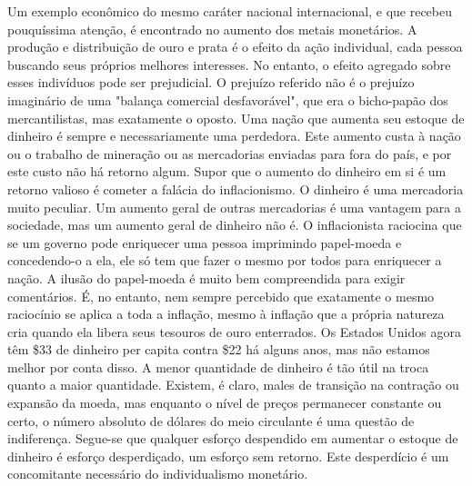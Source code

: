 \documentclass[12pt]{article}
\begin{document}
Um exemplo econômico do mesmo caráter nacional internacional, e que recebeu pouquíssima atenção, é encontrado no aumento dos metais monetários. A produção e distribuição de ouro e prata é o efeito da ação individual, cada pessoa buscando seus próprios melhores interesses. No entanto, o efeito agregado sobre esses indivíduos pode ser prejudicial. O prejuízo referido não é o prejuízo imaginário de uma "balança comercial desfavorável", que era o bicho-papão dos mercantilistas, mas exatamente o oposto. Uma nação que aumenta seu estoque de dinheiro é sempre e necessariamente uma perdedora. Este aumento custa à nação ou o trabalho de mineração ou as mercadorias enviadas para fora do país, e por este custo não há retorno algum. Supor que o aumento do dinheiro em si é um retorno valioso é cometer a falácia do inflacionismo. O dinheiro é uma mercadoria muito peculiar. Um aumento geral de outras mercadorias é uma vantagem para a sociedade, mas um aumento geral de dinheiro não é. O inflacionista raciocina que se um governo pode enriquecer uma pessoa imprimindo papel-moeda e concedendo-o a ela, ele só tem que fazer o mesmo por todos para enriquecer a nação. A ilusão do papel-moeda é muito bem compreendida para exigir comentários. É, no entanto, nem sempre percebido que exatamente o mesmo raciocínio se aplica a toda a inflação, mesmo à inflação que a própria natureza cria quando ela libera seus tesouros de ouro enterrados. Os Estados Unidos agora têm \$33 de dinheiro per capita contra \$22 há alguns anos, mas não estamos melhor por conta disso. A menor quantidade de dinheiro é tão útil na troca quanto a maior quantidade. Existem, é claro, males de transição na contração ou expansão da moeda, mas enquanto o nível de preços permanecer constante ou certo, o número absoluto de dólares do meio circulante é uma questão de indiferença. Segue-se que qualquer esforço despendido em aumentar o estoque de dinheiro é esforço desperdiçado, um esforço sem retorno. Este desperdício é um concomitante necessário do individualismo monetário.
\end{document}
